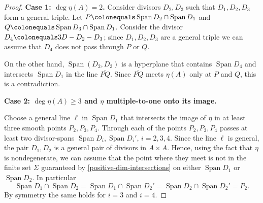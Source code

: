 \documentclass[11pt]{amsart}
\newcommand{\Span}{\operatorname{Span}}
\theoremstyle{definition}
\theoremstyle{remark}
\begin{document}
\begin{proof}
\noindent
\textbf{\boldmath Case 1: \(\deg\eta(A) =2\).} 
Consider divisors $D_2, D_3$ such that $D_1, D_2, D_3$ form a general triple. Let $P\colonequals \Span D_2\cap \Span D_1$ and $Q \colonequals \Span D_3 \cap \Span D_1$. Consider the divisor $D_4 \colonequals 3D-D_2-D_3$; since $D_1, D_2, D_3$ are a general triple we can assume that $D_4$ does not pass through $P$ or $Q$.
\begin{center}
    
    
\end{center}
On the other hand, $\Span(D_2, D_3)$ is a hyperplane that contains $\Span D_4$ and intersects $\Span D_1$ in the line $\overline{P Q}$.  Since \(\overline{PQ}\) meets \(\eta(A)\) only at \(P\) and \(Q\), this is a contradiction.
\medskip

\noindent
\textbf{\boldmath Case 2: \(\deg \eta(A)\geqslant 3\) and \(\eta\) multiple-to-one onto its image.} 

Choose a general line $\ell$ in $\Span D_1$ that intersects the image of $\eta$ in at least three smooth points $P_2, P_3, P_4$. 
Through each of the points $P_2, P_3, P_4$ passes at least two divisor-spans $\Span D_i, \Span D_i'$, $i=2,3,4$. 
Since the line \(\ell\) is general, the pair \(D_1, D_2\) is a general pair of divisors in \(A \times A\).  Hence, using the fact that \(\eta\) is nondegenerate, we can assume that the point where they meet is not in the finite set \(\Sigma\) guaranteed by \eqref{positive-dim-intersections} on either \(\Span D_1\) or \(\Span D_2\).  In particular
\[\Span D_1 \cap \Span D_2 = \Span D_1 \cap \Span D_2' = \Span D_2 \cap \Span D_2' = P_2.\]
By symmetry the same holds for \(i = 3\) and \(i=4\).


\end{proof}
\end{document}
